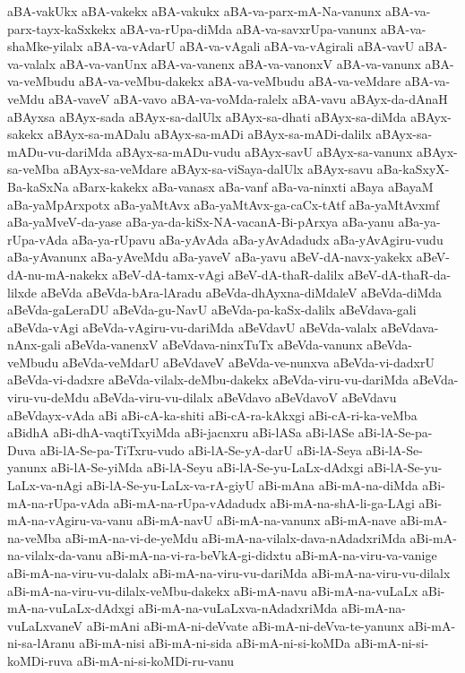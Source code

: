 {aBA-vakUkx
aBA-vakekx
aBA-vakukx
aBA-va-parx-mA-Na-vanunx
aBA-va-parx-tayx-kaSxkekx
aBA-va-rUpa-diMda
aBA-va-savxrUpa-vanunx
aBA-va-shaMke-yilalx
aBA-va-vAdarU
aBA-va-vAgali
aBA-va-vAgirali
aBA-vavU
aBA-va-valalx
aBA-va-vanUnx
aBA-va-vanenx
aBA-va-vanonxV
aBA-va-vanunx
aBA-va-veMbudu
aBA-va-veMbu-dakekx
aBA-va-veMbudu
aBA-va-veMdare
aBA-va-veMdu
aBA-vaveV
aBA-vavo
aBA-va-voMda-ralelx
aBA-vavu
aBAyx-da-dAnaH
aBAyxsa
aBAyx-sada
aBAyx-sa-dalUlx
aBAyx-sa-dhati
aBAyx-sa-diMda
aBAyx-sakekx
aBAyx-sa-mADalu
aBAyx-sa-mADi
aBAyx-sa-mADi-dalilx
aBAyx-sa-mADu-vu-dariMda
aBAyx-sa-mADu-vudu
aBAyx-savU
aBAyx-sa-vanunx
aBAyx-sa-veMba
aBAyx-sa-veMdare
aBAyx-sa-viSaya-dalUlx
aBAyx-savu
aBa-kaSxyX-Ba-kaSxNa
aBarx-kakekx
aBa-vanasx
aBa-vanf
aBa-va-ninxti
aBaya
aBayaM
aBa-yaMpArxpotx
aBa-yaMtAvx
aBa-yaMtAvx-ga-caCx-tAtf
aBa-yaMtAvxmf
aBa-yaMveV-da-yase
aBa-ya-da-kiSx-NA-vacanA-Bi-pArxya
aBa-yanu
aBa-ya-rUpa-vAda
aBa-ya-rUpavu
aBa-yAvAda
aBa-yAvAdadudx
aBa-yAvAgiru-vudu
aBa-yAvanunx
aBa-yAveMdu
aBa-yaveV
aBa-yavu
aBeV-dA-navx-yakekx
aBeV-dA-nu-mA-nakekx
aBeV-dA-tamx-vAgi
aBeV-dA-thaR-dalilx
aBeV-dA-thaR-da-lilxde
aBeVda
aBeVda-bAra-lAradu
aBeVda-dhAyxna-diMdaleV
aBeVda-diMda
aBeVda-gaLeraDU
aBeVda-gu-NavU
aBeVda-pa-kaSx-dalilx
aBeVdava-gali
aBeVda-vAgi
aBeVda-vAgiru-vu-dariMda
aBeVdavU
aBeVda-valalx
aBeVdava-nAnx-gali
aBeVda-vanenxV
aBeVdava-ninxTuTx
aBeVda-vanunx
aBeVda-veMbudu
aBeVda-veMdarU
aBeVdaveV
aBeVda-ve-nunxva
aBeVda-vi-dadxrU
aBeVda-vi-dadxre
aBeVda-vilalx-deMbu-dakekx
aBeVda-viru-vu-dariMda
aBeVda-viru-vu-deMdu
aBeVda-viru-vu-dilalx
aBeVdavo
aBeVdavoV
aBeVdavu
aBeVdayx-vAda
aBi
aBi-cA-ka-shiti
aBi-cA-ra-kAkxgi
aBi-cA-ri-ka-veMba
aBidhA
aBi-dhA-vaqtiTxyiMda
aBi-jacnxru
aBi-lASa
aBi-lASe
aBi-lA-Se-pa-Duva
aBi-lA-Se-pa-TiTxru-vudo
aBi-lA-Se-yA-darU
aBi-lA-Seya
aBi-lA-Se-yanunx
aBi-lA-Se-yiMda
aBi-lA-Seyu
aBi-lA-Se-yu-LaLx-dAdxgi
aBi-lA-Se-yu-LaLx-va-nAgi
aBi-lA-Se-yu-LaLx-va-rA-giyU
aBi-mAna
aBi-mA-na-diMda
aBi-mA-na-rUpa-vAda
aBi-mA-na-rUpa-vAdadudx
aBi-mA-na-shA-li-ga-LAgi
aBi-mA-na-vAgiru-va-vanu
aBi-mA-navU
aBi-mA-na-vanunx
aBi-mA-nave
aBi-mA-na-veMba
aBi-mA-na-vi-de-yeMdu
aBi-mA-na-vilalx-dava-nAdadxriMda
aBi-mA-na-vilalx-da-vanu
aBi-mA-na-vi-ra-beVkA-gi-didxtu
aBi-mA-na-viru-va-vanige
aBi-mA-na-viru-vu-dalalx
aBi-mA-na-viru-vu-dariMda
aBi-mA-na-viru-vu-dilalx
aBi-mA-na-viru-vu-dilalx-veMbu-dakekx
aBi-mA-navu
aBi-mA-na-vuLaLx
aBi-mA-na-vuLaLx-dAdxgi
aBi-mA-na-vuLaLxva-nAdadxriMda
aBi-mA-na-vuLaLxvaneV
aBi-mAni
aBi-mA-ni-deVvate
aBi-mA-ni-deVva-te-yanunx
aBi-mA-ni-sa-lAranu
aBi-mA-nisi
aBi-mA-ni-sida
aBi-mA-ni-si-koMDa
aBi-mA-ni-si-koMDi-ruva
aBi-mA-ni-si-koMDi-ru-vanu
}
